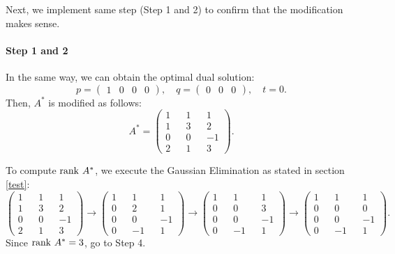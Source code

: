 \begin{example}
Next, we implement same step (Step 1 and 2) to confirm that the modification makes sense.

\paragraph{Step 1 and 2\\}
In the same way, we can obtain the optimal dual solution:
\begin{equation}
p = \begin{pmatrix} 1 & 0 & 0 & 0 \end{pmatrix}, \quad
q = \begin{pmatrix} 0 & 0 & 0 \end{pmatrix}, \quad
t   = 0. \label{eqexdual2}
\end{equation}
Then, $ A^{\ast} $ is modified as follows:
\begin{equation}
A^{\ast} = \left( \begin{array}{ccccc}
1 & & 1 & & 1 \\ 1 & & 3 & & 2 \\ 0 & & 0 & & -1 \\ 2 & & 1 & & 3 
\end{array} \right).
\end{equation}

To compute $ \mathrm{rank} \  A^{\ast} $, we execute the Gaussian Elimination as stated in section \ref{test}:
\begin{equation}
\left( \begin{array}{ccccc}
1 & & 1 & & 1 \\ 1 & & 3 & & 2 \\ 0 & & 0 & & -1 \\ 2 & & 1 & & 3 
\end{array} \right)
\rightarrow
\left( \begin{array}{ccccc}
1 & & 1 & & 1 \\ 0 & & 2 & & 1 \\ 0 & & 0 & & -1 \\ 0 & & -1 & & 1 
\end{array} \right)
\rightarrow
\left( \begin{array}{ccccc}
1 & & 1 & & 1 \\ 0 & & 0 & & 3 \\ 0 & & 0 & & -1 \\ 0 & & -1 & & 1 
\end{array} \right)
\rightarrow
\left( \begin{array}{ccccc}
1 & & 1 & & 1 \\ 0 & & 0 & & 0 \\ 0 & & 0 & & -1 \\ 0 & & -1 & & 1 
\end{array} \right). \label{eqexge}
\end{equation}
Since $ \mathrm{rank} \  A^{\ast} = 3 $, go to Step 4.


\end{example}
